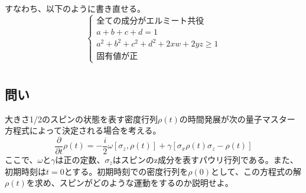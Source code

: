 \documentclass[10pt]{ujarticle}
\begin{document}
すなわち、以下のように書き直せる。
\[
\begin{cases}
  全ての成分がエルミート共役\\
  a+b+c+d=1\\
  a^2+b^2+c^2+d^2+2xw+2yz \geq 1\\
  固有値が正
\end{cases}
\]

\section{}
\subsection{問い}
大きさ1/2のスピンの状態を表す密度行列$\rho(t)$の時間発展が次の量子マスター方程式によって決定される場合を考える。
\[
\frac{\partial}{\partial t}\rho(t) = -\frac{i}{2} \omega[\sigma_z, \rho(t)] + \gamma[\sigma_x \rho(t) \sigma_z - \rho(t)]
\]
ここで、$\omega$と$\gamma$は正の定数、$\sigma_z$はスピンのz成分を表すパウリ行列である。また、初期時刻は$t=0$とする。初期時刻での密度行列を$\rho(0)$として、この方程式の解$\rho(t)$を求め、スピンがどのような運動をするのか説明せよ。
\end{document}
